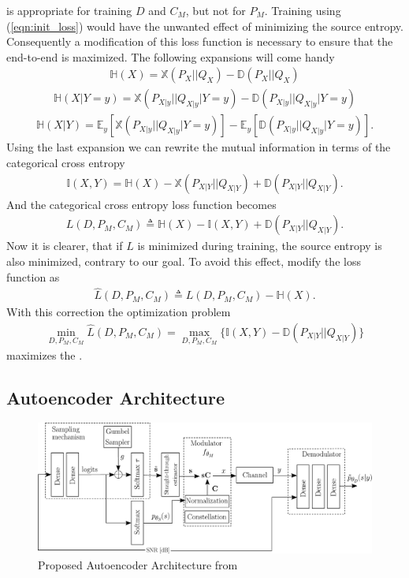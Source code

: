 is appropriate for training $D$ and $C_M$, but not for $P_M$. Training using (\ref{eqn:init_loss}) would have the unwanted effect of minimizing the source entropy. Consequently a modification of this loss function is necessary to ensure that the end-to-end  is maximized. The following expansions will come handy
\begin{align}
	\mathbb{H}(X) = \mathbb{X}(P_{X}||Q_{X}) - \mathbb{D}(P_{X}||Q_{X})
\end{align}
\begin{align}
	\mathbb{H}(X|Y=y) = \mathbb{X}(P_{X|y}||Q_{X|y}|Y=y) - \mathbb{D}(P_{X|y}||Q_{X|y}|Y=y)
\end{align}
\begin{align}
	\mathbb{H}(X|Y) = \mathbb{E}_y\left[\mathbb{X}(P_{X|y}||Q_{X|y}|Y=y)\right] - \mathbb{E}_y \left[\mathbb{D}(P_{X|y}||Q_{X|y}|Y=y)\right].
\end{align}
Using the last expansion we can rewrite the mutual information in terms of the categorical cross entropy
\begin{align}
	\mathbb{I} \left(X , Y\right) = \mathbb{H}(X) - \mathbb{X}(P_{X|Y}||Q_{X|Y}) + \mathbb{D}(P_{X|Y}||Q_{X|Y}).
\end{align}
And the categorical cross entropy loss function becomes 
\begin{align}
	L(D, P_M, C_M) \triangleq \mathbb{H}(X) - \mathbb{I} \left(X , Y\right) + \mathbb{D}(P_{X|Y}||Q_{X|Y}).
\end{align}
Now it is clearer, that if $L$ is minimized during training, the source entropy is also minimized, contrary to our goal. To avoid this effect, \citeauthor{Stark} modify the loss function as
\begin{align}
	\hat{L}(D, P_M, C_M) \triangleq L(D, P_M, C_M) - \mathbb{H}(X).
\end{align}
With this correction the optimization problem 
\begin{align}
	\min_{D, P_M, C_M}\hat{L}(D, P_M, C_M) = \max_{D, P_M, C_M} \{ \mathbb{I} \left(X , Y\right) - \mathbb{D}(P_{X|Y}||Q_{X|Y})\}
\end{align}
maximizes the .
\subsection{Autoencoder Architecture}

\begin{figure}[H]
	\includegraphics[width=\textwidth]{figs/stark_diagram.pdf}
	\centering	
	\caption{Proposed Autoencoder Architecture from \cite{Stark}}
	\label{fig:starkAe}
\end{figure}


